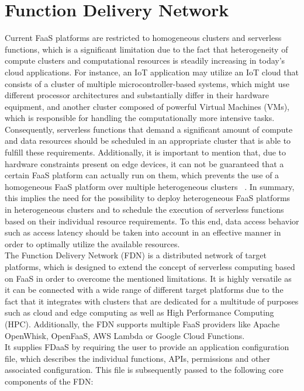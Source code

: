 \section{Function Delivery Network}
Current FaaS platforms are restricted to homogeneous clusters and serverless functions, which is a significant limitation due to the fact that heterogeneity of compute clusters and computational resources is steadily increasing in today's cloud applications. For instance, an IoT application may utilize an IoT cloud that consists of a cluster of multiple microcontroller-based systems, which might use different processor architectures and substantially differ in their hardware equipment, and another cluster composed of powerful Virtual Machines (VMs), which is responsible for handling the computationally more intensive tasks. Consequently, serverless functions that demand a significant amount of compute and data resources should be scheduled in an appropriate cluster that is able to fulfill these requirements. Additionally, it is important to mention that, due to hardware constraints present on edge devices, it can not be guaranteed that a certain FaaS platform can actually run on them, which prevents the use of a homogeneous FaaS platform over multiple heterogeneous clusters ~\parencite{fdn}.
In summary, this implies the need for the possibility to deploy heterogeneous FaaS platforms in heterogeneous clusters and to schedule the execution of serverless functions based on their individual resource requirements. To this end, data access behavior such as access latency should be taken into account in an effective manner in order to optimally utilize the available resources.
\\
The Function Delivery Network (FDN) is a distributed network of target platforms, which is designed to extend the concept of serverless computing based on FaaS in order to overcome the mentioned limitations. It is highly versatile as it can be connected with a wide range of different target platforms due to the fact that it integrates with clusters that are dedicated for a multitude of purposes such as cloud and edge computing as well as High Performance Computing (HPC). Additionally, the FDN supports multiple FaaS providers like Apache OpenWhisk, OpenFaaS, AWS Lambda or Google Cloud Functions.\\
It supplies FDaaS by requiring the user to provide an application configuration file, which describes the individual functions, APIs, permissions and other associated configuration. This file is subsequently passed to the following core components of the FDN:


